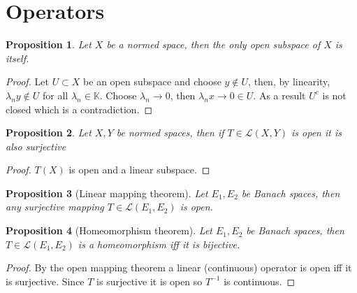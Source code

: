 \documentclass[12pt]{article}
\newtheorem{proposition}{Proposition}
\begin{document}
\section{Operators}
\begin{proposition}
	Let $X$ be a normed space, then the only open subspace of $X$ is itself.
\end{proposition}
\begin{proof}
	Let $U\subset X$ be an open subspace and choose $y\notin U$, then, by linearity, $\lambda_n y\notin U$ for all $\lambda_n\in\mathbb{K}$. Choose $\lambda_n\to 0$, then $\lambda_n x\to 0 \in U$. As a result $U^c$ is not closed which is a contradiction.
\end{proof}
\begin{proposition}
	Let $X, Y$ be normed spaces, then if $T\in\mathcal{L}(X,Y)$ is open it is also surjective
\end{proposition}
\begin{proof}
	$T(X)$ is open and a linear subspace.
\end{proof}
\begin{proposition}[Linear mapping theorem]
	Let $E_1,E_2$ be Banach spaces, then any surjective mapping $T\in\mathcal{L}(E_1,E_2)$ is open.
\end{proposition}
\begin{proposition}[Homeomorphism theorem]
	Let $E_1,E_2$ be Banach spaces, then $T\in\mathcal{L}(E_1,E_2)$ is a homeomorphism iff it is bijective.
\end{proposition}
\begin{proof}
	By the open mapping theorem a linear (continuous) operator is open iff it is surjective. Since $T$ is surjective it is open so $T^{-1}$ is continuous.
\end{proof}
\end{document}
